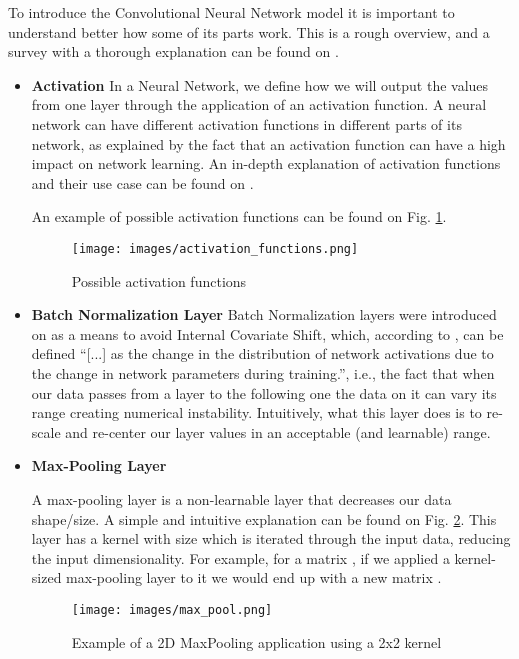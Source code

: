 \documentclass[conference]{IEEEtran}
\begin{document}
To introduce the Convolutional Neural Network model it is important to understand better how some of its parts work. This is a rough overview, and a survey with a thorough explanation can be found on \cite{b2}.

\begin{itemize}
\item \textbf{Activation} In a Neural Network, we define how we will output the values from one layer through the application of an activation function. A neural network can have different activation functions in different parts of its network, as explained by the fact that an activation function can have a high impact on network learning. An in-depth explanation of activation functions and their use case can be found on \cite{b4}.

An example of possible activation functions can be found on Fig. \ref{activation_functions}.

\begin{figure}[htbp]
\centerline{\texttt{[image: images/activation\_functions.png]}}
\caption{Possible activation functions \cite{b4}}
\label{activation_functions}
\end{figure}

\item \textbf{Batch Normalization Layer} Batch Normalization layers were introduced on \cite{b5} as a means to avoid Internal Covariate Shift, which, according to \cite{b5}, can be defined ``[...] as the change in the distribution of network activations due to the change in network parameters during training.'', i.e., the fact that when our data passes from a layer to the following one the data on it can vary its range creating numerical instability. Intuitively, what this layer does is to re-scale and re-center our layer values in an acceptable (and learnable) range.

\item \textbf{Max-Pooling Layer}

A max-pooling layer is a non-learnable layer that decreases our data shape/size. A simple and intuitive explanation can be found on Fig. \ref{max_pooling}. This layer has a kernel with size  which is iterated through the input data, reducing the input dimensionality. For example, for a matrix , if we applied a  kernel-sized max-pooling layer to it we would end up with a new matrix .

\begin{figure}[htbp]
\centerline{\texttt{[image: images/max\_pool.png]}}
\caption{Example of a 2D MaxPooling application using a 2x2 kernel \cite{b3}}
\label{max_pooling}
\end{figure}


\end{itemize}
\end{document}
